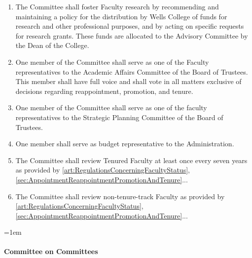 \documentclass{manual}
\let\oldparagraph\paragraph
\renewcommand\paragraph{\leftskip=1em\oldparagraph}
\newcommand{\itemLevelA}{\alph*.}
\newcommand{\itemLevelB}{\arabic*)}
\newcommand{\itemRefA}{\alph*}
\newcommand{\itemRefB}{\arabic*}
\begin{document}
\begin{enumerate}[label=\itemLevelA,ref=\itemRefA]
\begin{enumerate}[label=\itemLevelB,ref=\itemRefB]
		\item The Committee shall foster Faculty research by recommending and maintaining a policy for the distribution by Wells College of funds for research and other professional purposes, and by acting on specific requests for research grants. These funds are allocated to the Advisory Committee by the Dean of the College.
		\item One member of the Committee shall serve as one of the Faculty representatives to the Academic Affairs Committee of the Board of Trustees. This member shall have full voice and shall vote in all matters exclusive of decisions regarding reappointment, promotion, and tenure.
		\item One member of the Committee shall serve as one of the faculty representatives to the Strategic Planning Committee of the Board of Trustees.
		\item One member shall serve as budget representative to the Administration.
		\item The Committee shall review Tenured Faculty at least once every seven years as provided by \cref{art:RegulationsConcerningFacultyStatus}, \cref{sec:AppointmentReappointmentPromotionAndTenure}...
		\item The Committee shall review non-tenure-track Faculty as provided by \cref{art:RegulationsConcerningFacultyStatus}, \cref{sec:AppointmentReappointmentPromotionAndTenure}...
		\end{enumerate}

	\end{enumerate}

\paragraph{Committee on Committees}
\end{document}

